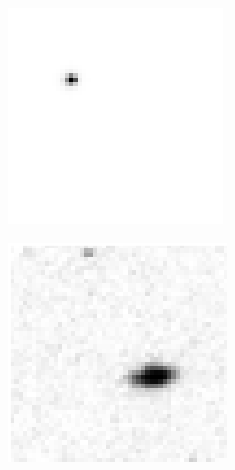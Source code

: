 \begin{figure}[!h]
\centering
    \begin{subfigure}[t]{.23\textwidth}
        \centering
        \includegraphics[width=\textwidth]{images/fcwrongImage1.png}
        \caption{}
        \label{fig:pointcosmicmis}
    \end{subfigure}
    \begin{subfigure}[t]{.23\textwidth}
        \centering
        \includegraphics[width=\textwidth]{images/fcwrongImage3.png}

\end{subfigure}
\end{figure}

